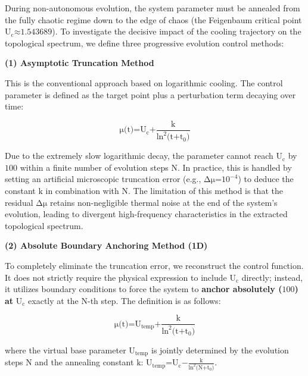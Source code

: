 During non-autonomous evolution, the system parameter must be annealed
from the fully chaotic regime down to the edge of chaos (the Feigenbaum
critical point \(\text{U}_{\text{c}}\text{≈1.543689}\)). To investigate
the decisive impact of the cooling trajectory on the topological
spectrum, we define three progressive evolution control methods:

\textbf{(1) Asymptotic Truncation Method}

This is the conventional approach based on logarithmic cooling. The
control parameter is defined as the target point plus a perturbation
term decaying over time:

\[\text{μ}\text{(}\text{t}\text{)=}\text{U}_{\text{c}}\text{+}\frac{\text{k}}{\text{ln}^{\text{2}}\text{(}\text{t}\text{+}\text{t}_{\text{0}}\text{)}}\]

Due to the extremely slow logarithmic decay, the parameter cannot reach
\(\text{U}_{\text{c}}\) by \(\text{100}\) within a finite number of
evolution steps \(\text{N}\). In practice, this is handled by setting an
artificial microscopic truncation error (e.g.,
\(\text{Δ}\text{μ}\text{=}\text{10}^{\text{−4}}\)) to deduce the
constant \(\text{k}\) in combination with \(\text{N}\). The limitation
of this method is that the residual \(\text{Δ}\text{μ}\) retains
non-negligible thermal noise at the end of the system's evolution,
leading to divergent high-frequency characteristics in the extracted
topological spectrum.

\textbf{(2) Absolute Boundary Anchoring Method (1D)}

To completely eliminate the truncation error, we reconstruct the control
function. It does not strictly require the physical expression to
include \(\text{U}_{\text{c}}\) directly; instead, it utilizes boundary
conditions to force the system to \textbf{anchor absolutely
(}\(\text{100}\)\textbf{) at} \(\text{U}_{\text{c}}\) exactly at the
\(\text{N}\)-th step. The definition is as follows:

\[\text{μ}\text{(}\text{t}\text{)=}\text{U}_{\text{temp}}\text{+}\frac{\text{k}}{\text{ln}^{\text{2}}\text{(}\text{t}\text{+}\text{t}_{\text{0}}\text{)}}\]

where the virtual base parameter \(\text{U}_{\text{temp}}\) is jointly
determined by the evolution steps \(\text{N}\) and the annealing
constant \(\text{k}\):
\(\text{U}_{\text{temp}}\text{=}\text{U}_{\text{c}}\text{−}\frac{\text{k}}{\text{ln}^{\text{2}}\text{(}\text{N}\text{+}\text{t}_{\text{0}}\text{)}}\).

